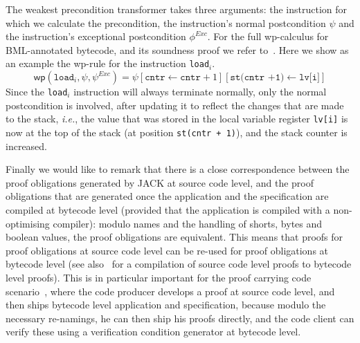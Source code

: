 The weakest precondition transformer takes three arguments: the
instruction for which we calculate the precondition, the instruction's
normal postcondition $\psi$ and the instruction's exceptional
postcondition $\phi^{\mathit{Exc}}$. For the full wp-calculus for
BML-annotated bytecode, and its soundness proof we refer
to~\cite{Pavlova:phd}. Here we show as an example the wp-rule for the
instruction \texttt{load\(_i\)}.
\[
\mathsf{wp}(\texttt{load}_i, \psi, \psi^{\mathit{Exc}})  = 
\psi[\texttt{cntr} \leftarrow \texttt{cntr} + 1][\texttt{st(cntr +1)}
\leftarrow \texttt{lv[i]}]
\]
Since the \texttt{load}\(_i\) instruction will always terminate
normally, only the normal postcondition is involved, after updating it
to reflect the changes that are made to the stack, \emph{i.e.}, the
value that was stored in the local variable register \texttt{lv[i]} is
now at the top of the stack (at position \texttt{st(cntr + 1)}),  and 
the stack counter is increased.



Finally we would like to remark that there is a close correspondence
between the proof obligations generated by JACK at source code level,
and the proof obligations that are generated once the application and
the specification are compiled at bytecode level (provided that the
application is compiled with a non-optimising compiler): modulo names
and the handling of shorts, bytes and boolean values, the proof
obligations are equivalent. This means that proofs for proof
obligations at source code level can be re-used for proof obligations
at bytecode level (see also~\cite{gta05:fast} for a compilation of
source code level proofs to bytecode level proofs). This is in
particular important for the proof carrying code
scenario~\cite{Necula97}, where the code producer develops a proof at
source code level, and then ships bytecode level application and
specification, because modulo the necessary re-namings, he can then
ship his proofs directly, and the code client can verify these using a
verification condition generator at bytecode level.


